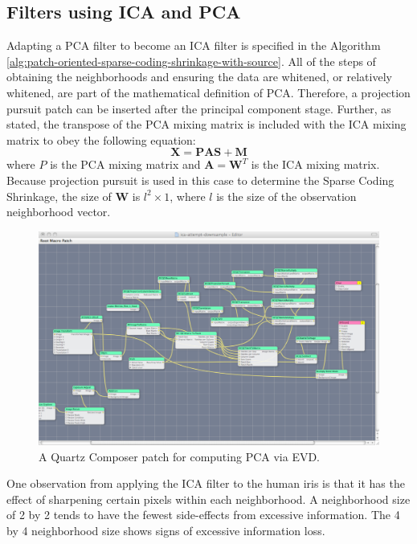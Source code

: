 \documentclass[11pt]{article}
\begin{document}
\subsection{Filters using ICA and PCA}\label{transformation-masking-maps}
Adapting a PCA filter to become an ICA filter is specified in the Algorithm \ref{alg:patch-oriented-sparse-coding-shrinkage-with-source}.  All of the steps of obtaining the neighborhoods and ensuring the data are whitened, or relatively whitened, are part of the mathematical definition of PCA.  Therefore, a projection pursuit patch can be inserted after the principal component stage.  Further, as stated, the transpose of the PCA mixing matrix is included with the ICA mixing matrix to obey the following equation:
\begin{equation}
\mathbf{X} = \mathbf{PAS} + \mathbf{M}
\end{equation}
where $P$ is the PCA mixing matrix and $\mathbf{A} = \mathbf{W}^T$ is the ICA mixing matrix.   Because projection pursuit is used in this case to determine the Sparse Coding Shrinkage, the size of $\mathbf{W}$ is $l^2 \times 1$, where $l$ is the size of the observation neighborhood vector.
\begin{figure}[htbp] %
   \centering
   \includegraphics[width=6in]{ica-downsample.pdf} 
   \caption{A Quartz Composer patch for computing PCA via EVD.}
   \label{downsampled-pca-quartz-composer}
\end{figure}
One observation from applying the ICA filter to the human iris%
is that it has the effect of sharpening certain pixels within each neighborhood.   A neighborhood size of 2 by 2 tends to have the fewest side-effects from excessive information.   The 4 by 4 neighborhood size shows signs of excessive information loss.
\end{document}
